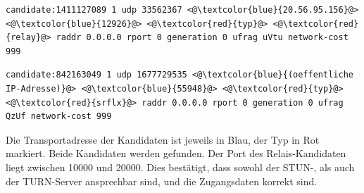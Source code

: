 \vspace{1pc}
\lstset{style=STYLE_ICE_CANDIDATE_0}
\begin{lstlisting}[caption={Relais-Kandidat},captionpos=b,label={lst:relaiskandidat}]
candidate:1411127089 1 udp 33562367 <@\textcolor{blue}{20.56.95.156}@> <@\textcolor{blue}{12926}@> <@\textcolor{red}{typ}@> <@\textcolor{red}{relay}@> raddr 0.0.0.0 rport 0 generation 0 ufrag uVtu network-cost 999
\end{lstlisting}

\vspace{1pc}
\lstset{style=STYLE_ICE_CANDIDATE_0}
\begin{lstlisting}[caption={Server-Reflexiver-Kandidat},captionpos=b,label={lst:srflxkandidat}]
candidate:842163049 1 udp 1677729535 <@\textcolor{blue}{(oeffentliche IP-Adresse)}@> <@\textcolor{blue}{55948}@> <@\textcolor{red}{typ}@> <@\textcolor{red}{srflx}@> raddr 0.0.0.0 rport 0 generation 0 ufrag QzUf network-cost 999
\end{lstlisting}

Die Transportadresse der Kandidaten ist jeweils in Blau, der Typ in Rot markiert. Beide Kandidaten werden gefunden. Der Port des Relais-Kandidaten liegt zwischen 10000 und 20000. Dies bestätigt, dass sowohl der STUN-, als auch der TURN-Server ansprechbar sind, und die Zugangsdaten korrekt sind.